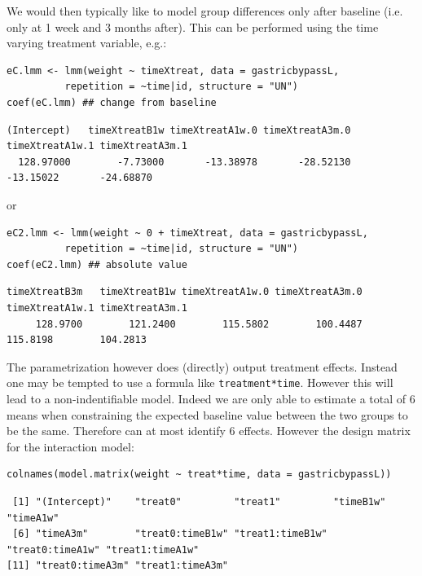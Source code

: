 \documentclass[12pt]{article}
\begin{document}
We would then typically like to model group differences only after
baseline (i.e. only at 1 week and 3 months after). This can be
performed using the time varying treatment variable, e.g.:
\lstset{language=r,label= ,caption= ,captionpos=b,numbers=none}
\begin{lstlisting}
eC.lmm <- lmm(weight ~ timeXtreat, data = gastricbypassL,
	      repetition = ~time|id, structure = "UN")
coef(eC.lmm) ## change from baseline
\end{lstlisting}

\begin{verbatim}
(Intercept)   timeXtreatB1w timeXtreatA1w.0 timeXtreatA3m.0 timeXtreatA1w.1 timeXtreatA3m.1 
  128.97000        -7.73000       -13.38978       -28.52130       -13.15022       -24.68870
\end{verbatim}


or
\lstset{language=r,label= ,caption= ,captionpos=b,numbers=none}
\begin{lstlisting}
eC2.lmm <- lmm(weight ~ 0 + timeXtreat, data = gastricbypassL,
	      repetition = ~time|id, structure = "UN")
coef(eC2.lmm) ## absolute value
\end{lstlisting}

\begin{verbatim}
timeXtreatB3m   timeXtreatB1w timeXtreatA1w.0 timeXtreatA3m.0 timeXtreatA1w.1 timeXtreatA3m.1 
     128.9700        121.2400        115.5802        100.4487        115.8198        104.2813
\end{verbatim}


The parametrization however does (directly) output treatment
effects. Instead one may be tempted to use a formula like
\texttt{treatment*time}. However this will lead to a non-indentifiable
model. Indeed we are only able to estimate a total of 6 means when
constraining the expected baseline value between the two groups to be
the same. Therefore can at most identify 6 effects. However the
design matrix for the interaction model:
\lstset{language=r,label= ,caption= ,captionpos=b,numbers=none}
\begin{lstlisting}
colnames(model.matrix(weight ~ treat*time, data = gastricbypassL))
\end{lstlisting}

\begin{verbatim}
 [1] "(Intercept)"    "treat0"         "treat1"         "timeB1w"        "timeA1w"       
 [6] "timeA3m"        "treat0:timeB1w" "treat1:timeB1w" "treat0:timeA1w" "treat1:timeA1w"
[11] "treat0:timeA3m" "treat1:timeA3m"
\end{verbatim}
\end{document}
